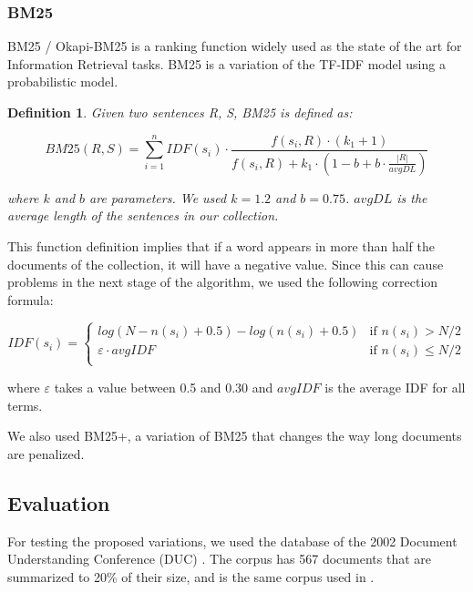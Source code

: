 \documentclass{llncs}
\newtheorem{definicion}{Definition}
\begin{document}
\subsubsection{BM25}
BM25 / Okapi-BM25 is a ranking function widely used as the state of the art for Information Retrieval tasks. BM25 is a variation of the TF-IDF model using a probabilistic model.

\begin{definicion}
Given two sentences R, S, BM25 is defined as:

\begin{equation}
BM25(R,S) = \sum_{i=1}^{n} IDF(s_i) \cdot \frac{f(s_i, R) \cdot (k_1 + 1)}{f(s_i, R) + k_1 \cdot (1 - b + b \cdot \frac{|R|}{avgDL})}
\end{equation}

where $k$ and $b$ are parameters. We used $k = 1.2$ and $b = 0.75$. $avgDL$ is the average length of the sentences in our collection.
\end{definicion}

This function definition implies that if a word appears in more than half the documents of the collection, it will have a negative value. Since this can cause problems in the next stage of the algorithm, we used the following correction formula:
                
\begin{equation}
 IDF(s_i) =
  \begin{cases}
       log(N - n(s_i) + 0.5) - log(n(s_i) + 0.5)    & \text{if }  n(s_i) > N/2\\
       \varepsilon \cdot avgIDF                     & \text{if }  n(s_i) \leq N/2\\
  \end{cases}
\end{equation}                
                
where $\varepsilon$ takes a value between 0.5 and 0.30 and $avgIDF$ is the average IDF for all terms.

We also used BM25+, a variation of BM25 that changes the way long documents are penalized.


\subsection{Evaluation}
For testing the proposed variations, we used the database of the 2002 Document Understanding Conference (DUC) \cite{duc2002-guidelines}. The corpus has 567 documents that are summarized to 20\% of their size, and is the same corpus used in \cite{mihalcea-tarau}. 
\end{document}
